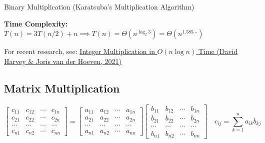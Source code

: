 \documentclass[10pt]{article}
\begin{document}
\begin{algorithm}
	\SetAlgoLined
	\caption{Binary Multiplication (Karatsuba's Multiplication Algorithm)}
\end{algorithm}

\textbf{Time Complexity:} $T(n) = 3T(n/2) + n\implies T(n) = \Theta(n^{\log_2 3}) = \Theta(n^{1.585\cdots})$

For recent research, see: \href{https://annals.math.princeton.edu/2021/193-2/p04}{Integer Multiplication in $O(n\log n)$ Time (David Harvey \& Joris van der Hoeven, 2021)}

\subsection{Matrix Multiplication}

$$
\left[
\begin{matrix}
	c_{11} & c_{12} & \cdots & c_{1n}\\
	c_{21} & c_{22} & \cdots & c_{2n}\\
	\cdots & \cdots & \cdots & \cdots\\
	c_{n1} & c_{n2} & \cdots & c_{nn}
\end{matrix}
\right]
=
\left[
\begin{matrix}
	a_{11} & a_{12} & \cdots & a_{1n}\\
	a_{21} & a_{22} & \cdots & a_{2n}\\
	\cdots & \cdots & \cdots & \cdots\\
	a_{n1} & a_{n2} & \cdots & a_{nn}
\end{matrix}
\right]
\left[
\begin{matrix}
	b_{11} & b_{12} & \cdots & b_{1n}\\
	b_{21} & b_{22} & \cdots & b_{2n}\\
	\cdots & \cdots & \cdots & \cdots\\
	b_{n1} & b_{n2} & \cdots & b_{nn}
\end{matrix}
\right]\quad
c_{ij} = \sum_{k=1}^n a_{ik} b_{kj}
$$
\end{document}
